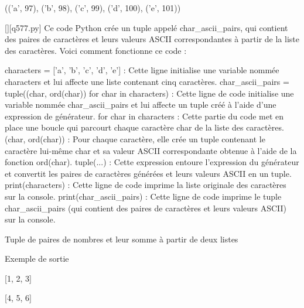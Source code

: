 (('a', 97), ('b', 98), ('c', 99), ('d', 100), ('e', 101))
        \par
        \begin{solution}
            \renewcommand{\nomfichier}{q577.py}
            \pythonfile{\chemincode \nomfichier}[][\nomfichier]
            Ce code Python crée un tuple appelé char_ascii_pairs, qui contient des paires de caractères et leurs valeurs ASCII correspondantes à partir de la liste des caractères. Voici comment fonctionne ce code :

    characters = ['a', 'b', 'c', 'd', 'e'] : Cette ligne initialise une variable nommée characters et lui affecte une liste contenant cinq caractères.
    char_ascii_pairs = tuple((char, ord(char)) for char in characters) : Cette ligne de code initialise une variable nommée char_ascii_pairs et lui affecte un tuple créé à l'aide d'une expression de générateur.
        for char in characters : Cette partie du code met en place une boucle qui parcourt chaque caractère char de la liste des caractères.
        (char, ord(char)) : Pour chaque caractère, elle crée un tuple contenant le caractère lui-même char et sa valeur ASCII correspondante obtenue à l'aide de la fonction ord(char).
        tuple(...) : Cette expression entoure l'expression du générateur et convertit les paires de caractères générées et leurs valeurs ASCII en un tuple.
    print(characters) : Cette ligne de code imprime la liste originale des caractères sur la console.
    print(char_ascii_pairs) : Cette ligne de code imprime le tuple char_ascii_pairs (qui contient des paires de caractères et leurs valeurs ASCII) sur la console.
        \end{solution}
        

        \question
        Tuple de paires de nombres et leur somme à partir de deux listes

Exemple de sortie

[1, 2, 3]

[4, 5, 6]


